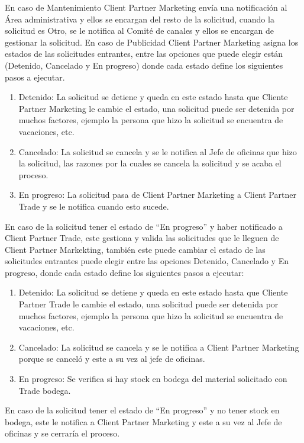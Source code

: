En caso de Mantenimiento Client Partner Marketing envía una notificación 
al Área administrativa y ellos se encargan del resto de la solicitud, cuando la solicitud es Otro, se le notifica al Comité de canales y ellos se encargan de gestionar la solicitud. En caso de Publicidad Client Partner Marketing asigna los estados de las solicitudes entrantes, entre las opciones que puede elegir están (Detenido, Cancelado y En progreso) donde cada estado define los siguientes pasos a ejecutar.
\begin{enumerate}
	\item Detenido: La solicitud se detiene y queda en este estado hasta que Cliente Partner Marketing le cambie el estado, una solicitud puede ser detenida por muchos factores, ejemplo la persona que hizo la solicitud se encuentra de vacaciones, etc.
	\item Cancelado: La solicitud se cancela y se le notifica al Jefe de oficinas que hizo la solicitud, las razones por la cuales se cancela la solicitud y se acaba el proceso.
	\item En progreso: La solicitud pasa de Client Partner Marketing a Client Partner Trade y se le notifica cuando esto sucede.
\end{enumerate}
En caso de la solicitud tener el estado de ``En progreso'' y haber notificado a Client Partner Trade, este gestiona y valida las solicitudes que le lleguen de Client Partner Markekting, también este puede cambiar el estado de las solicitudes entrantes puede elegir entre las opciones Detenido, Cancelado y En progreso, donde cada estado define los siguientes pasos a ejecutar:
\begin{enumerate}
	\item Detenido: La solicitud se detiene y queda en este estado hasta que Cliente Partner Trade le cambie el estado, una solicitud puede ser detenida por muchos factores, ejemplo la persona que hizo la solicitud se encuentra de vacaciones, etc.
	\item Cancelado: La solicitud se cancela y se le notifica a Client Partner Marketing porque se canceló y este a su vez al jefe de oficinas.
	\item En progreso: Se verifica si hay stock en bodega del material solicitado con Trade bodega.
\end{enumerate}

En caso de la solicitud tener el estado de ``En progreso'' y no tener stock en bodega, este le notifica a Client Partner Marketing y este a su vez al Jefe de oficinas y se cerraría el proceso.


